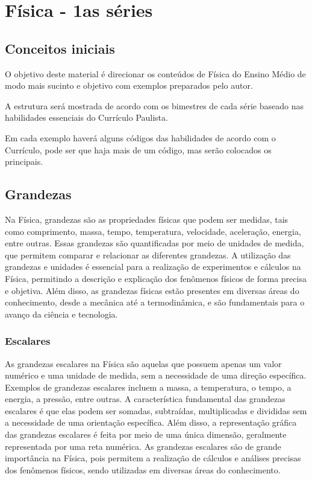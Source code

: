 
\chapter{Física - 1as séries}

\section{Conceitos iniciais}
O objetivo deste material é direcionar os conteúdos de Física do Ensino Médio de modo mais sucinto e objetivo com exemplos preparados pelo autor.

A estrutura será mostrada de acordo com os bimestres de cada série baseado nas habilidades essenciais do Currículo Paulista.

Em cada exemplo haverá alguns códigos das habilidades de acordo com o Currículo, pode ser que haja mais de um código, mas serão colocados os principais.

\section{Grandezas}
Na Física, grandezas são as propriedades físicas que podem ser medidas, tais como comprimento, massa, tempo, temperatura, velocidade, aceleração, energia, entre outras. Essas grandezas são quantificadas por meio de unidades de medida, que permitem comparar e relacionar as diferentes grandezas. A utilização das grandezas e unidades é essencial para a realização de experimentos e cálculos na Física, permitindo a descrição e explicação dos fenômenos físicos de forma precisa e objetiva. Além disso, as grandezas físicas estão presentes em diversas áreas do conhecimento, desde a mecânica até a termodinâmica, e são fundamentais para o avanço da ciência e tecnologia.
\subsection{Escalares}
As grandezas escalares na Física são aquelas que possuem apenas um valor numérico e uma unidade de medida, sem a necessidade de uma direção específica. Exemplos de grandezas escalares incluem a massa, a temperatura, o tempo, a energia, a pressão, entre outras. A característica fundamental das grandezas escalares é que elas podem ser somadas, subtraídas, multiplicadas e divididas sem a necessidade de uma orientação específica. Além disso, a representação gráfica das grandezas escalares é feita por meio de uma única dimensão, geralmente representada por uma reta numérica. As grandezas escalares são de grande importância na Física, pois permitem a realização de cálculos e análises precisas dos fenômenos físicos, sendo utilizadas em diversas áreas do conhecimento.
